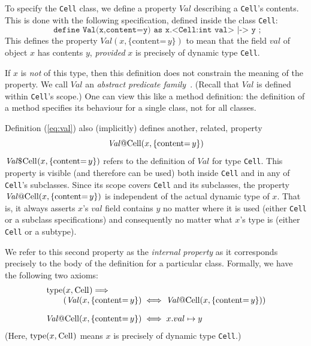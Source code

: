 \documentclass[11pt]{article}
\newcommand{\Val}{\mathit{Val}}
\newcommand{\content}[1]{\{\text{content=} \, #1 \}}
\def\J{\lstinline}
\newcommand{\JS}[1]{$\mathit{#1}$}
\begin{document}
To specify the \J~Cell~ class, we define a property \JS{Val} describing a \J~Cell~'s contents.  This is done with the following 
specification, defined inside the class \J~Cell~:
%
\begin{equation}
\label{eq:val}
\texttt{  define Val(x,content=y) as x.<Cell:int val> |-> y ;}
\end{equation}
%
This defines the property $\Val(x,\content y)$ to mean that the
field \JS{val} of object $x$ has contents $y$, \emph{provided} $x$ is
precisely of dynamic type \J~Cell~.  


If $x$ is \emph{not} of this type,
then this definition does not constrain the meaning of the property. We call
$\Val$ an \emph{abstract predicate family}~\cite{parkinson05}. (Recall that $\Val$ is defined within \J~Cell~'s scope.)  One can
view this like a method definition: the definition of a method specifies its behaviour for a single class, not for all classes.

Definition (\ref{eq:val}) also (implicitly) defines another, related, property 
\[
\Val\J~@Cell~(x,\content y)
\]
$\Val\$\J~Cell~(x,\content y)$ refers to the definition of $\Val$  for type \J~Cell~. 
This property is visible (and therefore can be used) both inside \J~Cell~ and in any of \J~Cell~'s subclasses.
Since its scope covers  \J~Cell~ and its subclasses, the property $\Val\J~@Cell~(x,\content y)$
is independent of the actual dynamic type of \JS{x}. That is, it always asserts \JS{x}'s
\JS{val} field contains \JS{y} no matter where it is used (either \J~Cell~ or a subclass specifications)
and consequently no matter what \JS{x}'s type is (either \J~Cell~ or a subtype).  

We refer
to this second property as the \emph{internal property} as it
corresponds precisely to the body of the definition for a particular
class. Formally, we have the following two axioms:
\[
\begin{array}{@{}r@{\;}c@{\;}l@{}}
\begin{array}[b]{@{}l@{}}
\J~type~(x, \J~Cell~) \Longrightarrow \\
\mbox{}\qquad(\Val(x,\content y)
\end{array} & \iff & \Val\J~@Cell~(x,\content y))
\\[1em]
\Val\J~@Cell~(x,\content y) &\iff& x.val \mapsto y
\end{array}
\]
(Here, $\J~type~(x, \J~Cell~)$ means $x$ is precisely of dynamic type
\J~Cell~.)
\end{document}
